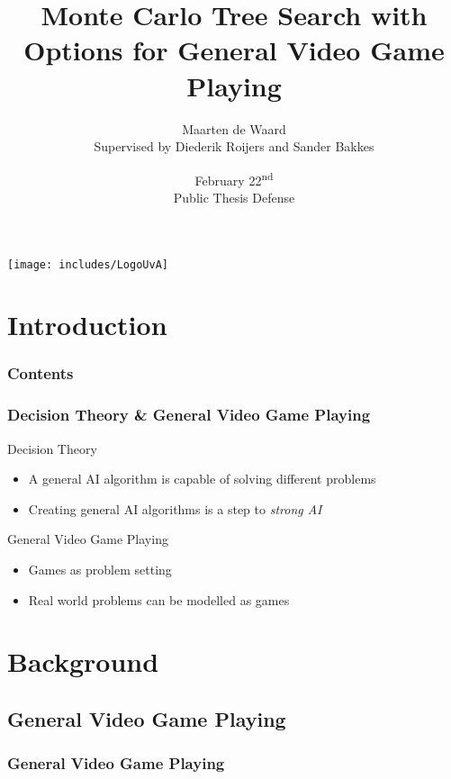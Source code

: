 \documentclass[aspectratio=169]{beamer}
\author[Maarten de Waard]{Maarten de Waard\\\small{Supervised by Diederik
	Roijers and Sander Bakkes}}
\title[O-MCTS for GVGP]{Monte Carlo Tree Search with Options for General Video Game Playing}
\date{February 22\textsuperscript{nd}\\Public Thesis Defense}
\begin{document}
\begin{frame}
	\vspace{-4.7em}
	\centerline{
	\texttt{[image: includes/LogoUvA]}
	}
	\maketitle
\end{frame}

\section{Introduction}

\begin{frame}
	\frametitle{Contents}
	\tableofcontents
\end{frame}

\begin{frame}
	\frametitle{Decision Theory \& General Video Game Playing}
	\begin{block}{Decision Theory}
		\begin{itemize}
			\item A general AI algorithm is capable of solving different problems
			\item Creating general AI algorithms is a step to \emph{strong AI}
		\end{itemize}
	\end{block}
	\begin{block}{General Video Game Playing}
		\begin{itemize}
			\item Games as problem setting
			\item Real world problems can be modelled as games
		\end{itemize}
	\end{block}
\end{frame}

\section{Background}

\subsection{General Video Game Playing}
\begin{frame}
	\frametitle{General Video Game Playing \cite{perez2014, schaul2013video}}
\end{frame}
\end{document}
